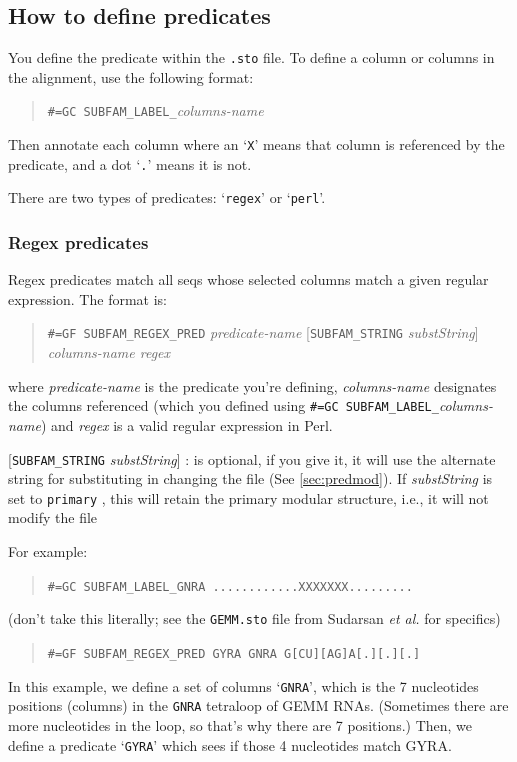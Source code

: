 \documentclass[letterpaper,12pt]{report}
\newcommand{\example}[1]{
\begin{quote}
{\raggedright
#1
}
\end{quote}
}
\begin{document}
\subsection{How to define predicates}
\label{subfampredicates}
You define the predicate within the {\tt .sto} file.  To define a
column or columns in the alignment, use the following format:

\example{{\tt \#=GC SUBFAM\_LABEL\_}\textit{columns-name}}

Then annotate each column where an {\textquoteleft}{\tt X}{\textquoteright}
means that column is referenced by the predicate, and a dot
{\textquoteleft}{\tt .}{\textquoteright} means it is not.

There are two types of predicates:
{\textquoteleft}{\tt regex}{\textquoteright} or
{\textquoteleft}{\tt perl}{\textquoteright}.  

\subsubsection{Regex predicates}

Regex predicates match
all seqs whose selected columns match a given regular expression.  The
format is:

\example{{\tt \#=GF SUBFAM\_REGEX\_PRED}  \textit{predicate-name} [{\tt SUBFAM\_STRING} \textit{substString}] \textit{columns-name
 regex}}

where \textit{predicate-name} is the predicate you{\textquoteright}re
defining, \textit{columns-name} designates the columns referenced
(which you defined using {\tt \#=GC SUBFAM\_LABEL\_}\textit{columns-name})
and \textit{regex} is a valid regular expression in Perl.  

[{\tt SUBFAM\_STRING} \textit{substString}] : is optional, if you give it, it will use the alternate string for substituting in changing the file (See \ref{sec:predmod}).  If \textit{substString} is set to {\tt primary} , this will retain the primary modular structure, i.e., it will not modify the file


For example:

\example{{\tt \#=GC SUBFAM\_LABEL\_GNRA  ............XXXXXXX......... }}

(don{\textquoteright}t take this literally; see the {\tt GEMM.sto} file from
Sudarsan {\it et al.} for specifics)

\example{{\tt \#=GF SUBFAM\_REGEX\_PRED GYRA GNRA G[CU][AG]A[.][.][.]}}

In this example, we define a set of columns
{\textquoteleft}{\tt GNRA}{\textquoteright}, which is the 7 nucleotides
positions (columns) in the {\tt GNRA} tetraloop of GEMM RNAs.  (Sometimes
there are more nucleotides in the loop, so that{\textquoteright}s why
there are 7 positions.)  Then, we define a predicate
{\textquoteleft}{\tt GYRA}{\textquoteright} which sees if those 4 nucleotides
match GYRA.
\end{document}
